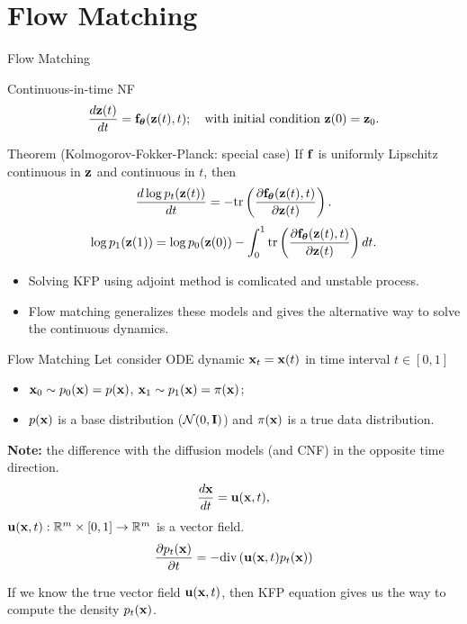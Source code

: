 \section{Flow Matching}
\begin{frame}{Flow Matching}
	\begin{block}{Continuous-in-time NF}
		\vspace{-0.2cm}
		\[
		   \frac{d \mathbf{z}(t)}{dt} = \mathbf{f}_{\boldsymbol{\theta}}(\mathbf{z}(t), t); \quad \text{with initial condition }\mathbf{z}(0) = \mathbf{z}_0. 
		\]
		\vspace{-0.3cm}
	\end{block}	
	\begin{block}{Theorem (Kolmogorov-Fokker-Planck: special case)}
		If $\mathbf{f}$ is uniformly Lipschitz continuous in $\mathbf{z}$ and continuous in $t$, then
		\[
			\frac{d \log p_t(\mathbf{z}(t))}{d t} = - \text{tr} \left( \frac{\partial \mathbf{f}_{\boldsymbol{\theta}}(\mathbf{z}(t), t)}{\partial \mathbf{z}(t)} \right).
		\]
		\[
			\log p_1(\mathbf{z}(1)) = \log p_0(\mathbf{z}(0)) - \int_{0}^{1} \text{tr}  \left( \frac{\partial \mathbf{f}_{\boldsymbol{\theta}}(\mathbf{z}(t), t)}{\partial \mathbf{z}(t)} \right) dt.
		\]
	\end{block}
	\begin{itemize}
		\item Solving KFP using adjoint method is comlicated and unstable process.
		\item Flow matching generalizes these models and gives the alternative way to solve the continuous dynamics.
	\end{itemize}
\end{frame}
\begin{frame}{Flow Matching}
	Let consider ODE dynamic $\mathbf{x}_t = \mathbf{x}(t)$ in time interval $t \in [0, 1]$
	\begin{itemize}
	\item $\mathbf{x}_0 \sim p_0(\mathbf{x}) = p(\mathbf{x})$, $\mathbf{x}_1 \sim p_1(\mathbf{x}) =  \pi(\mathbf{x})$;
	\item $p(\mathbf{x})$ is a base distribution ($\mathcal{N}(0, \mathbf{I})$) and $\pi(\mathbf{x})$ is a true data distribution.
	\end{itemize} 
	\textbf{Note:} the difference with the diffusion models (and CNF) in the opposite time direction.
	\[
		\frac{d \mathbf{x}}{dt} = \mathbf{u} (\mathbf{x}, t),
	\]
	$\mathbf{u} (\mathbf{x}, t): \mathbb{R}^m \times [0, 1] \rightarrow \mathbb{R}^m$ is a vector field.
	\[
		\frac{\partial p_t(\mathbf{x})}{\partial t} = - \text{div}\left(\mathbf{u}(\mathbf{x}, t) p_t(\mathbf{x})\right) 
	\]
	
	If we know the true vector field $\mathbf{u} (\mathbf{x}, t)$, then KFP equation gives us the way to compute the density $p_t(\mathbf{x})$.
\end{frame}
